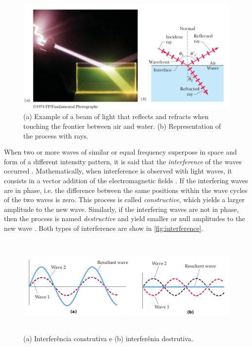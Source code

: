 \begin{figure}[htb]
	\centering
	\caption{\label{fig:beam_split} 
	    (a) Example of a beam of light that reflects and refracts when touching the frontier between air and water. (b) Representation of the process with rays.}
	\begin{center}
	    \includegraphics[scale=0.3]{images/fig3.png}
	\end{center}
	\centering
\end{figure}

When two or more waves of similar or equal frequency superpose in space and form of a different intensity pattern, it is said that the \emph{interference} of the waves occurred \cite{tipler2008physics}. Mathematically, when interference is observed with light waves, it consists in a vector addition of the electromagnetic fields \cite{zilio2009optica}.
If the interfering waves are in phase, i.e. the difference between the same positions within the wave cycles of the two waves is zero. This process is called \emph{constructive}, which yields a larger amplitude to the new wave. Similarly, if the interfering waves are not in phase, then the process is named \emph{destructive} and yield smaller or null amplitudes to the new wave \cite{tipler2007physics}. Both types of interference are show in \autoref{fig:interference}.

\begin{figure}[htb]
	\centering
	\caption{\label{fig:interference} 
	    (a) Interferência construtiva e (b) interferênia destrutiva.}
	\begin{center}
	    \includegraphics[width=\textwidth,height=5cm]{images/interference.png}
	\end{center}
	\centering
\end{figure}

